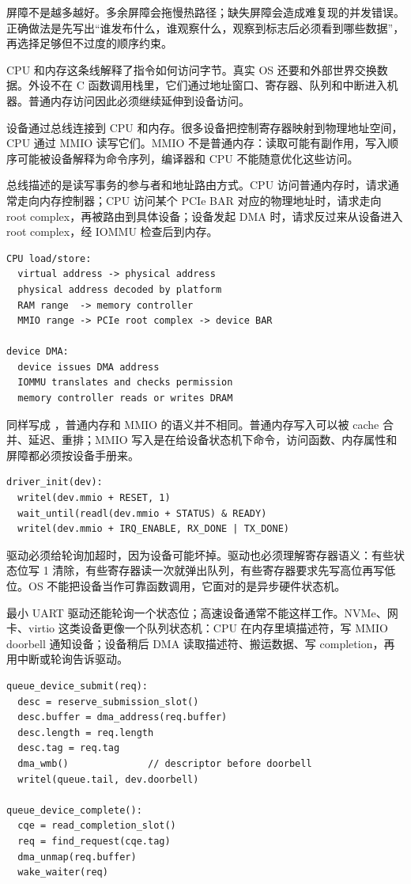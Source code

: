 屏障不是越多越好。多余屏障会拖慢热路径；缺失屏障会造成难复现的并发错误。正确做法是先写出“谁发布什么，谁观察什么，观察到标志后必须看到哪些数据”，再选择足够但不过度的顺序约束。

CPU 和内存这条线解释了指令如何访问字节。真实 OS 还要和外部世界交换数据。外设不在 C 函数调用栈里，它们通过地址窗口、寄存器、队列和中断进入机器。普通内存访问因此必须继续延伸到设备访问。

设备通过总线连接到 CPU 和内存。很多设备把控制寄存器映射到物理地址空间，CPU 通过 MMIO 读写它们。MMIO 不是普通内存：读取可能有副作用，写入顺序可能被设备解释为命令序列，编译器和 CPU 不能随意优化这些访问。

总线描述的是读写事务的参与者和地址路由方式。CPU 访问普通内存时，请求通常走向内存控制器；CPU 访问某个 PCIe BAR 对应的物理地址时，请求走向 root complex，再被路由到具体设备；设备发起 DMA 时，请求反过来从设备进入 root complex，经 IOMMU 检查后到内存。

\begin{lstlisting}
CPU load/store:
  virtual address -> physical address
  physical address decoded by platform
  RAM range  -> memory controller
  MMIO range -> PCIe root complex -> device BAR

device DMA:
  device issues DMA address
  IOMMU translates and checks permission
  memory controller reads or writes DRAM
\end{lstlisting}

同样写成 ，普通内存和 MMIO 的语义并不相同。普通内存写入可以被 cache 合并、延迟、重排；MMIO 写入是在给设备状态机下命令，访问函数、内存属性和屏障都必须按设备手册来。

\begin{lstlisting}
driver_init(dev):
  writel(dev.mmio + RESET, 1)
  wait_until(readl(dev.mmio + STATUS) & READY)
  writel(dev.mmio + IRQ_ENABLE, RX_DONE | TX_DONE)
\end{lstlisting}

驱动必须给轮询加超时，因为设备可能坏掉。驱动也必须理解寄存器语义：有些状态位写 1 清除，有些寄存器读一次就弹出队列，有些寄存器要求先写高位再写低位。OS 不能把设备当作可靠函数调用，它面对的是异步硬件状态机。

最小 UART 驱动还能轮询一个状态位；高速设备通常不能这样工作。NVMe、网卡、virtio 这类设备更像一个队列状态机：CPU 在内存里填描述符，写 MMIO doorbell 通知设备；设备稍后 DMA 读取描述符、搬运数据、写 completion，再用中断或轮询告诉驱动。

\begin{lstlisting}
queue_device_submit(req):
  desc = reserve_submission_slot()
  desc.buffer = dma_address(req.buffer)
  desc.length = req.length
  desc.tag = req.tag
  dma_wmb()              // descriptor before doorbell
  writel(queue.tail, dev.doorbell)

queue_device_complete():
  cqe = read_completion_slot()
  req = find_request(cqe.tag)
  dma_unmap(req.buffer)
  wake_waiter(req)
\end{lstlisting}

